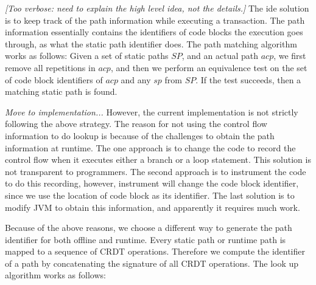 {\em [Too verbose: need to explain the high level idea, not the details.]}
The ide solution is to keep track of the path information while executing a transaction. The path
information essentially contains the identifiers of code blocks the execution goes through, as
what the static path identifier does. The path matching algorithm works as follows: Given a set
of static paths $SP$, and an actual path $acp$, we first remove all repetitions in $acp$, and then
we perform an equivalence test on the set of code block identifiers of $acp$ and any $sp$ from $SP$.
If the test succeeds, then a matching static path is found.

{\em Move to implementation...}
However, the current implementation is not strictly following the above strategy. The reason
for not using the control flow information to do lookup is because of the challenges to obtain
the path information at runtime. The one approach is to change the code to record the control flow
when it executes either a branch or a loop statement. This solution is not transparent to programmers.
The second approach is to instrument the code to do this recording, however, instrument will change
the code block identifier, since we use the location of code block as its identifier. The last
solution is to modify JVM to obtain this information, and apparently it requires much work.

Because of the above reasons, we choose a different way to generate the path identifier for both
offline and runtime. Every static path or runtime path is mapped to a sequence of CRDT operations. Therefore
we compute the identifier of a path by concatenating the signature of all CRDT operations. The look
up algorithm works as follows:

